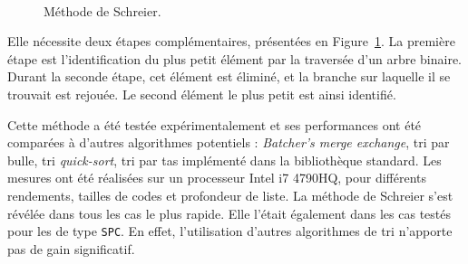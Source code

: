 \begin{figure}[t]
\centering
{}
\\
\caption{Méthode de Schreier.}
\label{fig:schreier_sort}
\end{figure}
Elle nécessite deux étapes complémentaires, présentées en Figure~\ref{fig:schreier_sort}. La première étape est l'identification du plus petit élément par la traversée d'un arbre binaire. Durant la seconde étape, cet élément est éliminé, et la branche sur laquelle il se trouvait est rejouée. Le second élément le plus petit est ainsi identifié.


Cette méthode a été testée expérimentalement et ses performances ont été comparées à d'autres algorithmes potentiels : \textit{Batcher's merge exchange}, tri par bulle, tri \textit{quick-sort}, tri par tas implémenté dans la bibliothèque standard. Les mesures ont été réalisées sur un processeur Intel i7 4790HQ, pour différents rendements, tailles de codes et profondeur de liste. La méthode de Schreier s'est révélée dans tous les cas le plus rapide. Elle l'était également dans les cas testés pour les \noeuds de type \texttt{SPC}. En effet, l'utilisation d'autres algorithmes de tri n'apporte pas de gain significatif.

